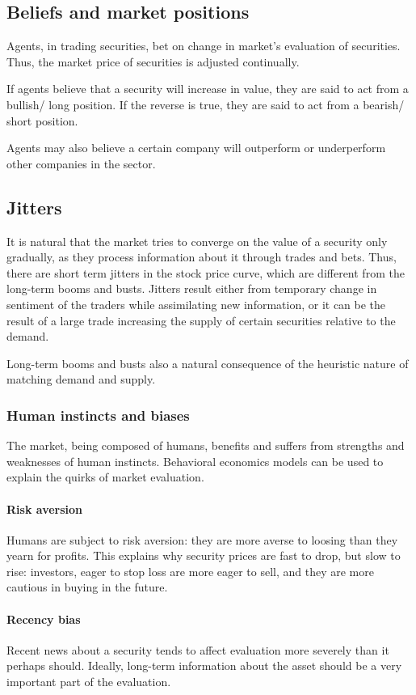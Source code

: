 \documentclass[oneside, article]{memoir}
\begin{document}
\subsection{Beliefs and market positions}
Agents, in trading securities, bet on change in market's evaluation of securities. Thus, the market price of securities is adjusted continually.

If agents believe that a security will increase in value, they are said to act from a bullish/ long position. If the reverse is true, they are said to act from a bearish/ short position.

Agents may also believe a certain company will outperform or underperform other companies in the sector.

\subsection{Jitters}
It is natural that the market tries to converge on the value of a security only gradually, as they process information about it through trades and bets. Thus, there are short term jitters in the stock price curve, which are different from the long-term booms and busts. Jitters result either from temporary change in sentiment of the traders while assimilating new information, or it can be the result of a large trade increasing the supply of certain securities relative to the demand.

Long-term booms and busts also a natural consequence of the heuristic nature of matching demand and supply.

\subsubsection{Human instincts and biases}
The market, being composed of humans, benefits and suffers from strengths and weaknesses of human instincts. Behavioral economics models can be used to explain the quirks of market evaluation.

\paragraph{Risk aversion}
Humans are subject to risk aversion: they are more averse to loosing than they yearn for profits. This explains why security prices are fast to drop, but slow to rise: investors, eager to stop loss are more eager to sell, and they are more cautious in buying in the future.

\paragraph{Recency bias}
Recent news about a security tends to affect evaluation more severely than it perhaps should. Ideally, long-term information about the asset should be a very important part of the evaluation.
\end{document}
